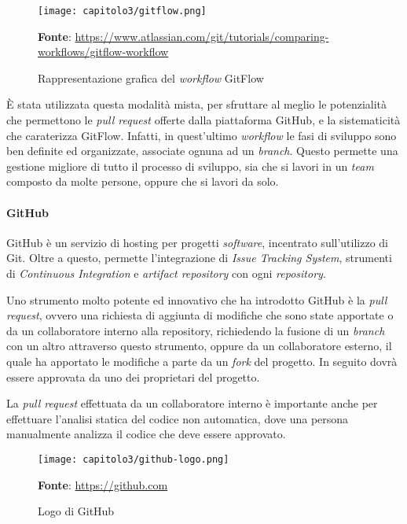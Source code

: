 \begin{figure}[h!]
  \centering
  \texttt{[image: capitolo3/gitflow.png]}
  \caption{Rappresentazione grafica del \textit{workflow} GitFlow}
  \textbf{Fonte}: \href{https://www.atlassian.com/git/tutorials/comparing-workflows/gitflow-workflow}{https://www.atlassian.com/git/tutorials/comparing-workflows/gitflow-workflow}
\end{figure}

È stata utilizzata questa modalità mista, per sfruttare al meglio le potenzialità che permettono le \textit{pull request} offerte dalla piattaforma GitHub, e la sistematicità che caraterizza GitFlow. Infatti, in quest'ultimo \textit{workflow} le fasi di sviluppo sono ben definite ed organizzate, associate ognuna ad un \textit{branch}. Questo permette una gestione migliore di tutto il processo di sviluppo, sia che si lavori in un \textit{team} composto da molte persone, oppure che si lavori da solo.

\paragraph{GitHub}
GitHub è un servizio di hosting per progetti \textit{software}, incentrato sull'utilizzo di Git. Oltre a questo, permette l'integrazione di \textit{Issue Tracking System}, strumenti di \textit{Continuous Integration} e \textit{artifact repository} con ogni \textit{repository}.

Uno strumento molto potente ed innovativo che ha introdotto GitHub è la \textit{pull request}, ovvero una richiesta di aggiunta di modifiche che sono state apportate o da un collaboratore interno alla repository, richiedendo la fusione di un \textit{branch} con un altro attraverso questo strumento, oppure da un collaboratore esterno, il quale ha apportato le modifiche a parte da un \textit{fork} del progetto. In seguito dovrà essere approvata da uno dei proprietari del progetto. 

La \textit{pull request} effettuata da un collaboratore interno è importante anche per effettuare l'analisi statica del codice non automatica, dove una persona manualmente analizza il codice che deve essere approvato.

\begin{figure}[h!]
  \centering
  \texttt{[image: capitolo3/github-logo.png]}
  \caption{Logo di GitHub}
  \textbf{Fonte}: \href{https://github.com}{https://github.com}
\end{figure}

